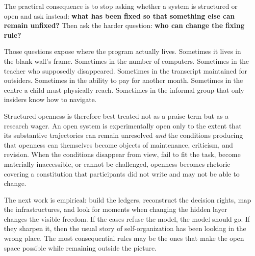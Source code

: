 \documentclass[11pt]{article}
\begin{document}
The practical consequence is to stop asking whether a system is structured or open and ask instead: \textbf{what has been fixed so that something else can remain unfixed?} Then ask the harder question: \textbf{who can change the fixing rule?}

Those questions expose where the program actually lives. Sometimes it lives in the blank wall's frame. Sometimes in the number of computers. Sometimes in the teacher who supposedly disappeared. Sometimes in the transcript maintained for outsiders. Sometimes in the ability to pay for another month. Sometimes in the centre a child must physically reach. Sometimes in the informal group that only insiders know how to navigate.

Structured openness is therefore best treated not as a praise term but as a research wager. An open system is experimentally open only to the extent that its substantive trajectories can remain unresolved \emph{and} the conditions producing that openness can themselves become objects of maintenance, criticism, and revision. When the conditions disappear from view, fail to fit the task, become materially inaccessible, or cannot be challenged, openness becomes rhetoric covering a constitution that participants did not write and may not be able to change.

The next work is empirical: build the ledgers, reconstruct the decision rights, map the infrastructures, and look for moments when changing the hidden layer changes the visible freedom. If the cases refuse the model, the model should go. If they sharpen it, then the usual story of self-organization has been looking in the wrong place. The most consequential rules may be the ones that make the open space possible while remaining outside the picture.
\end{document}
